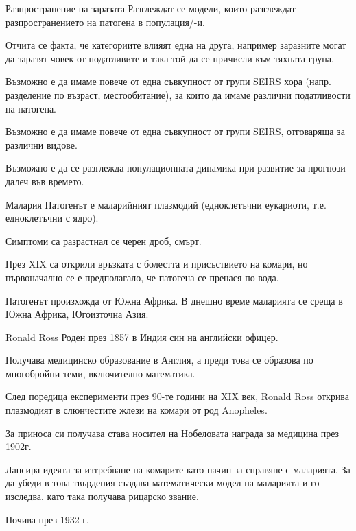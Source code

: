 \begin{frame}[t]{Разпространение на заразата}
  Разглеждат се модели, които разглеждат разпространението на патогена в популация/-и.

  Отчита се факта, че категориите влияят една на друга, например заразните могат да заразят човек от податливите и така той да се причисли към тяхната група.

  Възможно е да имаме повече от една съвкупност от групи SEIRS хора (напр. разделение по възраст, местообитание), за които да имаме различни податливости на патогена.

  Възможно е да имаме повече от една съвкупност от групи SEIRS, отговаряща за различни видове.

  Възможно е да се разглежда популационната динамика при развитие за прогнози далеч във времето.
\end{frame}

\begin{frame}[t]{Малария}
  Патогенът е маларийният плазмодий (едноклетъчни еукариоти, т.е. едноклетъчни с ядро).

  Симптоми са разрастнал се черен дроб, смърт.

  През XIX са открили връзката с болестта и присъствието на комари, но първоначално се е предполагало, че патогена се пренася по вода.

  Патогенът произхожда от Южна Африка.
  В днешно време маларията се среща в Южна Африка, Югоизточна Азия.
\end{frame}

\begin{frame}[t]{Ronald Ross}
  Роден през 1857 в Индия син на английски офицер.

  Получава медицинско образование в Англия, а преди това се образова по многобройни теми, включително математика.

  След поредица експерименти през 90-те години на XIX век, Ronald Ross открива плазмодият в слюнчестите жлези на комари от род Anopheles.

  За приноса си получава става носител на Нобеловата награда за медицина през 1902г.

  Лансира идеята за изтребване на комарите като начин за справяне с маларията.
  За да убеди в това твърдения създава математически модел на маларията и го изследва, като така получава рицарско звание.

  Почива през 1932 г.
\end{frame}

